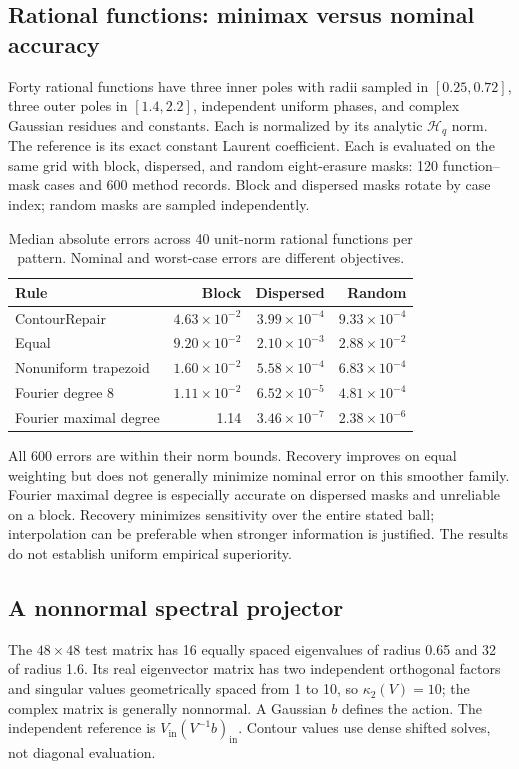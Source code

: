 \documentclass[11pt]{article}
\newcommand{\Hq}{\mathcal H_q}\newcommand{\E}{\mathcal E}
\begin{document}
\subsection{Rational functions: minimax versus nominal accuracy}
Forty rational functions have three inner poles with radii sampled in $[0.25,0.72]$, three outer poles in $[1.4,2.2]$, independent uniform phases, and complex Gaussian residues and constants. Each is normalized by its analytic $\Hq$ norm. The reference is its exact constant Laurent coefficient. Each is evaluated on the same grid with block, dispersed, and random eight-erasure masks: 120 function--mask cases and 600 method records. Block and dispersed masks rotate by case index; random masks are sampled independently.

\begin{table}[tb]\centering
\caption{Median absolute errors across 40 unit-norm rational functions per pattern. Nominal and worst-case errors are different objectives.}\label{tab:rational}
\begin{tabular}{lrrr}\toprule
Rule & Block & Dispersed & Random\\\midrule
ContourRepair & $4.63\times10^{-2}$ & $3.99\times10^{-4}$ & $9.33\times10^{-4}$\\
Equal & $9.20\times10^{-2}$ & $2.10\times10^{-3}$ & $2.88\times10^{-2}$\\
Nonuniform trapezoid & $1.60\times10^{-2}$ & $5.58\times10^{-4}$ & $6.83\times10^{-4}$\\
Fourier degree 8 & $1.11\times10^{-2}$ & $6.52\times10^{-5}$ & $4.81\times10^{-4}$\\
Fourier maximal degree & 1.14 & $3.46\times10^{-7}$ & $2.38\times10^{-6}$\\\bottomrule
\end{tabular}
\end{table}
All 600 errors are within their norm bounds. Recovery improves on equal weighting but does not generally minimize nominal error on this smoother family. Fourier maximal degree is especially accurate on dispersed masks and unreliable on a block. Recovery minimizes sensitivity over the entire stated ball; interpolation can be preferable when stronger information is justified. The results do not establish uniform empirical superiority.

\subsection{A nonnormal spectral projector}
The $48\times48$ test matrix has 16 equally spaced eigenvalues of radius 0.65 and 32 of radius 1.6. Its real eigenvector matrix has two independent orthogonal factors and singular values geometrically spaced from 1 to 10, so $\kappa_2(V)=10$; the complex matrix is generally nonnormal. A Gaussian $b$ defines the action. The independent reference is $V_{\mathrm{in}}(V^{-1}b)_{\mathrm{in}}$. Contour values use dense shifted solves, not diagonal evaluation.
\end{document}
